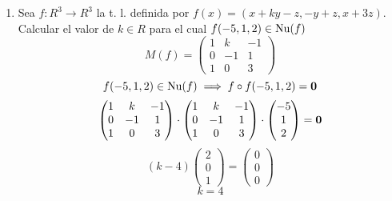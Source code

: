 \documentclass[../practica.root.tex]{subfiles}
\begin{document}
\begin{enumerate}
    \item Sea $f : R^3 \to R^3$ la t. l. definida por $f(x) = (x + ky - z, -y + z, x + 3z)$. Calcular el valor de $k \in R$ para el cual $f(-5,1,2) \in \operatorname{Nu}(f)$
          \[
              M(f) = \begin{pmatrix}
                  1 & k  & -1 \\
                  0 & -1 & 1  \\
                  1 & 0  & 3
              \end{pmatrix}
          \] \[
              f(-5,1,2) \in \operatorname{Nu}(f) \implies f\circ f(-5,1,2) = \mathbf{0}
          \] \[
              \begin{pmatrix}
                  1 & k  & -1 \\
                  0 & -1 & 1  \\
                  1 & 0  & 3
              \end{pmatrix}\cdot\begin{pmatrix}
                  1 & k  & -1 \\
                  0 & -1 & 1  \\
                  1 & 0  & 3
              \end{pmatrix}\cdot\begin{pmatrix}
                  -5 \\ 1 \\ 2
              \end{pmatrix} = \mathbf{0}
          \] \[
              (k-4)
              \begin{pmatrix}
                  2 \\ 0 \\ 1
              \end{pmatrix} = \begin{pmatrix}
                  0 \\ 0 \\ 0
              \end{pmatrix}
          \] \[
              \boxed{k = 4}
          \]


\end{enumerate}
\end{document}
